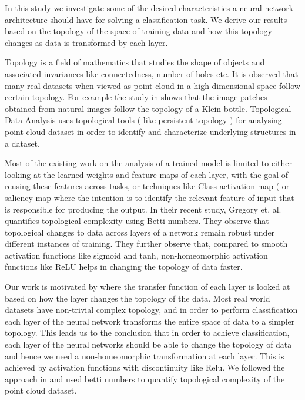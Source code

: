 \documentclass{bmvc2k}
\begin{document}
In this study we investigate some of the  desired characteristics a neural network architecture should have for solving a classification task. We derive our results based on the topology of the space of training data and how this topology changes as data is transformed by each layer.

Topology is a field of mathematics that studies the shape of objects and associated invariances like connectedness, number of holes etc.  It is observed that many real datasets when viewed as point cloud in a high dimensional space follow  certain topology. For example the study  in \cite{carlsson2008local} shows that the image patches obtained from natural images follow the topology of a Klein bottle. Topological Data Analysis\cite{carlsson2009topology}\cite{chazal2017introduction} uses topological tools ( like persistent topology ) for analysing point cloud dataset in order to identify and characterize underlying structures in a dataset.

Most of the existing work on the analysis of a trained model is limited to either looking at the learned weights and feature maps of each layer, with the goal of reusing these features across tasks, or techniques like Class activation map ( or saliency map\cite{meng2019class}  where the intention is to identify the relevant feature of input that is responsible for producing the output.  In their recent study, Gregory et. al. \cite{naitzat2020topology}  quantifies topological complexity using Betti numbers. They observe that topological changes to data across layers of a network remain robust under different instances of training. They further observe that, compared to smooth activation functions like sigmoid and tanh, non-homeomorphic activation functions like ReLU helps in changing the topology of data faster.

Our work is motivated by \cite{naitzat2020topology} where the transfer function of each layer is looked at based on  how the layer changes the topology of the data. Most real world datasets have non-trivial complex topology, and in order to perform classification each layer of the neural network transforms the entire space of data to a simpler topology. This leads us to the conclusion that in order to achieve classification, each layer of the neural networks should be able to change the topology of data and hence we need a non-homeomorphic transformation at each layer. This is achieved by activation functions with discontinuity like Relu. We followed the approach in \cite{naitzat2020topology} and used betti numbers to quantify  topological complexity of the point cloud dataset.
\end{document}
